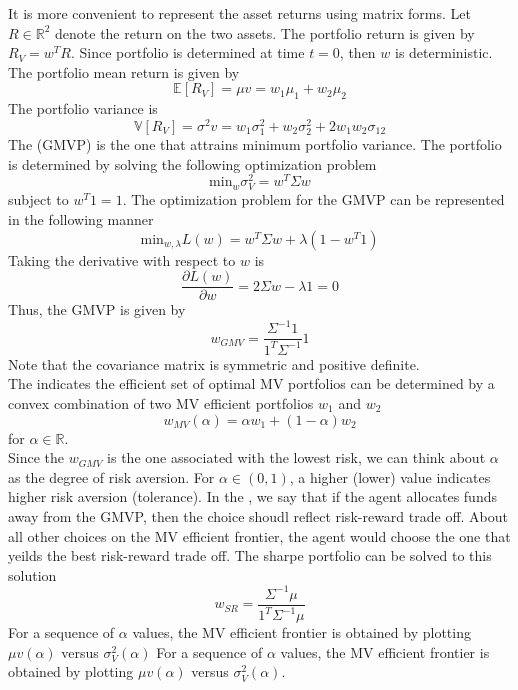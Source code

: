 \documentclass{article}
\begin{document}
It is more convenient to represent the asset returns using matrix forms. Let $R \in \mathbb{R}^2$ denote the return on the two assets. The portfolio return is given by $R_V = w^{T}R$. Since portfolio is determined at time $t=0$, then $w$ is deterministic. The portfolio mean return is given by $$\mathbb{E}[R_V] = \mu v = w_1 \mu_1 + w_2 \mu_2$$ The portfolio variance is $$\mathbb{V}[R_V] = \sigma^2 v = w_{1} \sigma_{1}^{2} + w_{2} \sigma_{2}^{2} + 2 w_1 w_2 \sigma_{12}$$ The  (GMVP) is the one that attrains minimum portfolio variance. The portfolio is determined by solving the following optimization problem $$\textrm{min}_w \sigma^{2}_{V} = w^{T} \Sigma w$$ subject to $w^{T} 1 = 1$. The optimization problem for the GMVP can be represented in the following manner $$\textrm{min}_{w, \lambda}L(w) = w^{T} \Sigma w + \lambda (1 - w^{T} 1)$$ Taking the derivative with respect to $w$ is $$\frac{\partial L(w)}{\partial w} = 2 \Sigma w - \lambda 1 = 0$$ Thus, the GMVP is given by $$w_{GMV} = \frac{\Sigma^{-1}1}{1^{T} \Sigma^{-1}}1$$ Note that the covariance matrix is symmetric and positive definite. \\ 

The  indicates the efficient set of optimal MV portfolios can be determined by a convex combination of two MV efficient portfolios $w_1$ and $w_2$ $$w_{MV}(\alpha) = \alpha w_1 + (1 - \alpha) w_2$$ for $\alpha \in \mathbb{R}$. \\ 

Since the $w_{GMV}$ is the one associated with the lowest risk, we can think about $\alpha$ as the degree of risk aversion. For $\alpha \in (0,1)$, a higher (lower) value indicates higher risk aversion (tolerance). In the , we say that if the agent allocates funds away from the GMVP, then the choice shoudl reflect risk-reward trade off. About all other choices on the MV efficient frontier, the agent would choose the one that yeilds the best risk-reward trade off. The sharpe portfolio can be solved to this solution $$w_{SR} = \frac{\Sigma^{-1} \mu}{1^{T} \Sigma^{-1} \mu}$$ For a sequence of $\alpha$ values, the MV efficient frontier is obtained by plotting $\mu v (\alpha)$ versus $\sigma_{V}^{2}(\alpha)$ For a sequence of $\alpha$ values, the MV efficient frontier is obtained by plotting $\mu v (\alpha)$ versus $\sigma_{V}^{2}(\alpha)$. 
\end{document}

